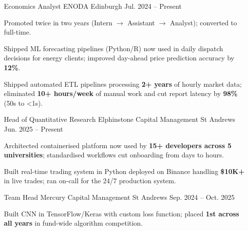 

\begin{cventries}

  \cventry
    {Economics Analyst} %
    {ENODA} %
    {Edinburgh} %
    {Jul. 2024 -- Present} %
    {
      \begin{cvitems}
        \item {Promoted twice in two years (Intern $\to$ Assistant $\to$ Analyst); converted to full-time.}
        \item {Shipped ML forecasting pipelines (Python/R) now used in daily dispatch decisions for energy clients; improved day-ahead price prediction accuracy by \textbf{12\%}.}
        \item {Shipped automated ETL pipelines processing \textbf{2+ years} of hourly market data; eliminated \textbf{10+ hours/week} of manual work and cut report latency by \textbf{98\%} (50s to <1s).}
      \end{cvitems}
    }

  \cventry
    {Head of Quantitative Research} %
    {Elphinstone Capital Management} %
    {St Andrews} %
    {Jun. 2025 -- Present} %
    {
      \begin{cvitems}
        \item {Architected containerised platform now used by \textbf{15+ developers across 5 universities}; standardised workflows cut onboarding from days to hours.}
        \item {Built real-time trading system in Python deployed on Binance handling \textbf{\$10K+} in live trades; ran on-call for the 24/7 production system.}
      \end{cvitems}
    }

  \cventry
    {Team Head} %
    {Mercury Capital Management} %
    {St Andrews} %
    {Sep. 2024 -- Oct. 2025} %
    {
      \begin{cvitems}
        \item {Built CNN in TensorFlow/Keras with custom loss function; placed \textbf{1st across all years} in fund-wide algorithm competition.}
      \end{cvitems}
    }

\end{cventries}
